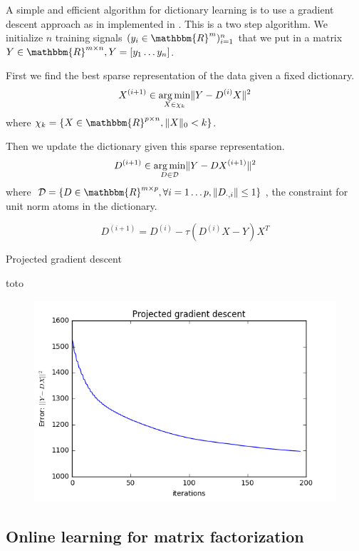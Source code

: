 \documentclass[a4paper,11pt]{article}
\newcommand{\RR}{\mathbbm{R}} %
\DeclarePairedDelimiter\norm{\lVert}{\rVert} %
\DeclareMathOperator*{\argmin}{arg\,min} %
\begin{document}
A simple and efficient algorithm for dictionary learning is to use a gradient descent approach as in implemented in \cite{nt4}.
This is a two step algorithm.
We initialize $n$ training signals $(y_i \in \RR^m)_{i=1}^{n}$
that we put in a matrix $Y \in \RR^{m \times n}, Y = [y_1 \ldots y_n]$.

First we find the best sparse representation of the data given a fixed dictionary.
$$ X^{(i+1)} \in \argmin_{X \in \chi_k} \norm{Y - D^{(i)}X}^2 $$
where $\chi_k = \{ X \in \RR^{p \times n}, \norm{X}_0<k \}$.

Then we update the dictionary given this sparse representation.
$$ D^{(i+1)} \in \argmin_{D \in \mathcal{D}} \norm{Y - DX^{(i+1)}}^2 $$
where $\mathcal{D} = \{ D \in \RR^{m \times p}, \forall i=1 \ldots p, \norm{D_{\cdot,i}} \leq 1 \}$, the constraint for unit norm atoms in the dictionary.


$$ D^{(i+1)} = D^{(i)} - \tau (D^{(i)}X - Y) X^T $$

\begin{algorithm}
\caption{Projected gradient descent}\label{pgd}
\begin{algorithmic}[1]
\State toto
\end{algorithmic}
\end{algorithm}

\begin{figure}[!htbp]
\centering
  \includegraphics[width=\linewidth]{projected_gradient_descent.png}
\end{figure}
\subsection{Online learning for matrix factorization}
\cite{mairal10}
\end{document}
